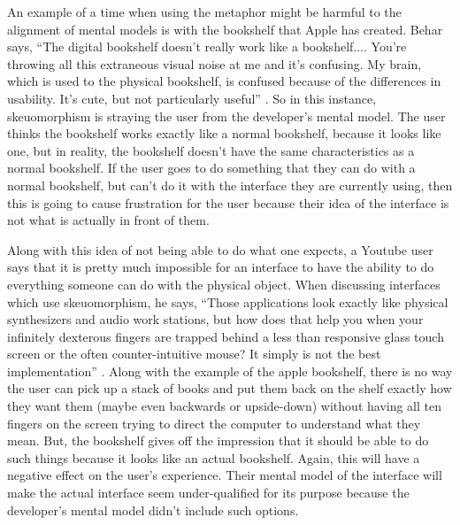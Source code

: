 \documentclass{article}
\begin{document}
An example of a time when using the metaphor might be harmful to the alignment of mental models is with the bookshelf that Apple has created. Behar says, ``The digital bookshelf doesn't really work like a bookshelf.... You're throwing all this extraneous visual noise at me and it's confusing. My brain, which is used to the physical bookshelf, is confused because of the differences in usability. It's cute, but not particularly useful'' \cite{appleinsider}. So in this instance, skeuomorphism is straying the user from the developer's mental model. The user thinks the bookshelf works exactly like a normal bookshelf, because it looks like one, but in reality, the bookshelf doesn't have the same characteristics as a normal bookshelf. If the user goes to do something that they can do with a normal bookshelf, but can't do it with the interface they are currently using, then this is going to cause frustration for the user because their idea of the interface is not what is actually in front of them.

Along with this idea of not being able to do what one expects, a Youtube user says that it is pretty much impossible for an interface to have the ability to do everything someone can do with the physical object. When discussing interfaces which use skeuomorphism, he says, ``Those applications look exactly like physical synthesizers and audio work stations, but how does that help you when your infinitely dexterous fingers are trapped behind a less than responsive glass touch screen or the often counter-intuitive mouse? It simply is not the best implementation'' \cite{youtube}. Along with the example of the apple bookshelf, there is no way the user can pick up a stack of books and put them back on the shelf exactly how they want them (maybe even backwards or upside-down) without having all ten fingers on the screen trying to direct the computer to understand what they mean. But, the bookshelf gives off the impression that it should be able to do such things because it looks like an actual bookshelf. Again, this will have a negative effect on the user's experience. Their mental model of the interface will make the actual interface seem under-qualified for its purpose because the developer's mental model didn't include such options.
\end{document}

